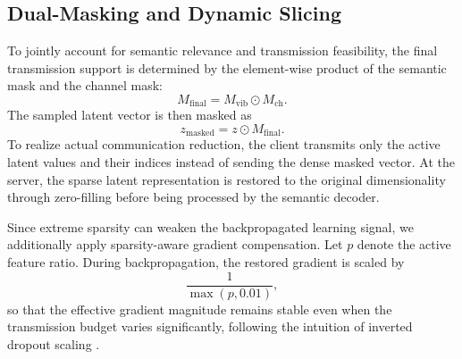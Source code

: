 \subsection{Dual-Masking and Dynamic Slicing}
To jointly account for semantic relevance and transmission feasibility, the final transmission support is determined by the element-wise product of the semantic mask and the channel mask:
\begin{equation}
M_{\mathrm{final}} = M_{\mathrm{vib}} \odot M_{\mathrm{ch}}.
\end{equation}
The sampled latent vector is then masked as
\begin{equation}
z_{\mathrm{masked}} = z \odot M_{\mathrm{final}}.
\end{equation}
To realize actual communication reduction, the client transmits only the active latent values and their indices instead of sending the dense masked vector. At the server, the sparse latent representation is restored to the original dimensionality through zero-filling before being processed by the semantic decoder.

Since extreme sparsity can weaken the backpropagated learning signal, we additionally apply sparsity-aware gradient compensation. Let $p$ denote the active feature ratio. During backpropagation, the restored gradient is scaled by
\begin{equation}
\frac{1}{\max(p, 0.01)},
\end{equation}
so that the effective gradient magnitude remains stable even when the transmission budget varies significantly, following the intuition of inverted dropout scaling \cite{gradientScale}.

